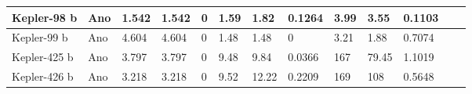 \documentclass[a4paper,12pt]{article}
\begin{document}
{{{{{{{{{{{{{\begin{table}[!ht]
\begin{tabularx}{\textwidth}{|p{60pt}|X|X|X|X|X|X|X|X|X|X|X|X|}
		\hline	
		Kepler-98 b & \cellcolor{lightgreen} Ano & 1.542 & 1.542 & \cellcolor{lightgreen} 0 & 1.59 & 1.82 & \cellcolor{lightorange} 0.1264 & 3.99 & 3.55 & \cellcolor{lightorange} 0.1103 \\	
		\hline
		Kepler-99 b & \cellcolor{lightgreen} Ano & 4.604 & 4.604 & \cellcolor{lightgreen} 0 & 1.48 & 1.48 & \cellcolor{lightgreen} 0 & 3.21 & 1.88 & \cellcolor{lightred} 0.7074 \\	
		\hline		
		Kepler-425 b & \cellcolor{lightgreen} Ano & 3.797 & 3.797 & \cellcolor{lightgreen} 0 & 9.48 & 9.84 & \cellcolor{lightgreen} 0.0366 & 167 & 79.45 & \cellcolor{lightred} 1.1019 \\	
		\hline	
		Kepler-426 b & \cellcolor{lightgreen} Ano & 3.218 & 3.218 & \cellcolor{lightgreen} 0 & 9.52 & 12.22 & \cellcolor{lightorange} 0.2209 & 169 & 108 & \cellcolor{lightred} 0.5648 \\	
		\hline	
	\end{tabularx}
\end{table}

\vspace{-20pt}

}}}}}}}}}}}}}
\end{document}
